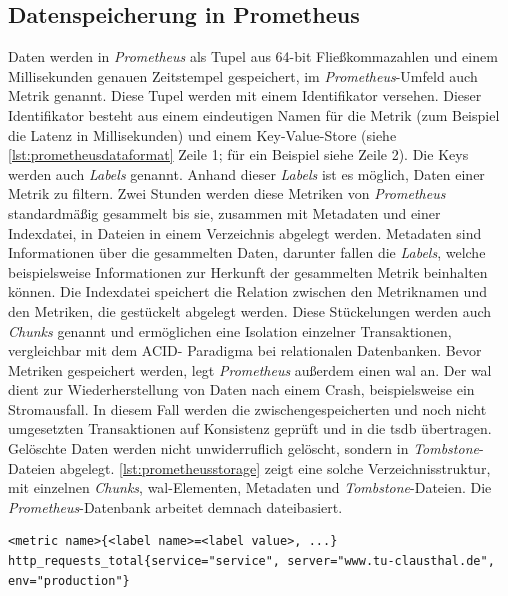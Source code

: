 \documentclass[titlepage]{report}
\begin{document}
\subsection{Datenspeicherung in Prometheus}
Daten werden in \emph{Prometheus} als Tupel aus 64\hyp{}bit
Fließkommazahlen und einem Millisekunden genauen Zeitstempel
gespeichert\cite{PROMETHEUS_DATA_MODEL}, im
\emph{Prometheus}\hyp{}Umfeld auch Metrik genannt. Diese Tupel werden
mit einem Identifikator versehen. Dieser Identifikator besteht aus einem
eindeutigen Namen für die Metrik (zum Beispiel die Latenz in
Millisekunden) und einem Key\hyp{}Value\hyp{}Store (siehe
\autoref{lst:prometheusdataformat} Zeile 1; für ein Beispiel siehe Zeile
2). Die Keys werden auch \emph{Labels} genannt. Anhand dieser
\emph{Labels} ist es möglich, Daten einer Metrik zu filtern. Zwei
Stunden werden diese Metriken von \emph{Prometheus} standardmäßig
gesammelt bis sie, zusammen mit Metadaten und einer Indexdatei, in
Dateien in einem Verzeichnis abgelegt werden. Metadaten sind
Informationen über die gesammelten Daten, darunter fallen die
\emph{Labels}, welche beispielsweise Informationen zur Herkunft der
gesammelten Metrik beinhalten können. Die Indexdatei speichert die
Relation zwischen den Metriknamen und den Metriken, die gestückelt
abgelegt werden. Diese Stückelungen werden auch \emph{Chunks}
genannt\cite{PROMETHEUS_STORAGE} und ermöglichen eine Isolation
einzelner Transaktionen, vergleichbar mit dem ACID\hyp{} Paradigma bei
relationalen Datenbanken. Bevor Metriken gespeichert werden, legt
\emph{Prometheus} außerdem einen \gls{wal} an. Der \gls{wal} dient zur
Wiederherstellung von Daten nach einem Crash, beispielsweise ein
Stromausfall. In diesem Fall werden die zwischengespeicherten und noch
nicht umgesetzten Transaktionen auf Konsistenz geprüft und in die
\gls{tsdb} übertragen.  Gelöschte Daten werden nicht unwiderruflich
gelöscht, sondern in \emph{Tombstone}\hyp{}Dateien abgelegt.
\autoref{lst:prometheusstorage} zeigt eine solche Verzeichnisstruktur,
mit einzelnen \emph{Chunks}, \gls{wal}\hyp{}Elementen, Metadaten und
\emph{Tombstone}\hyp{}Dateien. Die \emph{Prometheus}\hyp{}Datenbank
arbeitet demnach dateibasiert.
\begin{minipage}{\linewidth}
\begin{lstlisting}[caption={Prometheus Datenformat und
Beispiel},label={lst:prometheusdataformat}]
<metric name>{<label name>=<label value>, ...}
http_requests_total{service="service", server="www.tu-clausthal.de", env="production"}
\end{lstlisting}
\end{minipage}
\end{document}
